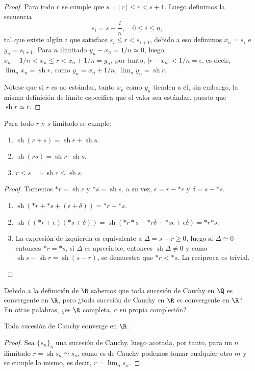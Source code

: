 \documentclass[11pt,oneside,a4paper]{book}
\DeclareMathOperator{\sh}{sh}
\begin{document}
\begin{proof}
Para todo $r$ se cumple que $s=\lfloor r\rfloor\leq r\lt s+1$. Luego definimos la secuencia
$$s_i=s+\frac{i}{n},\quad 0\leq i\leq n,$$
tal que existe algún $i$ que satisface $s_i\leq r\lt s_{i+1}$, debido a eso definimos $x_n=s_i$ e $y_n=s_{i+1}$. Para $n$ ilimitado $y_n-x_n=1/n\simeq 0$, luego $x_n-1/n\lt x_n\leq r\lt x_n+1/n=y_n$, por tanto, $|r-x_n|\lt1/n=\epsilon$, es decir, $\lim_n x_n=\sh r$, como $y_n=x_n+1/n$, $\lim_n y_n=\sh r$.

Nótese que si $r$ es no estándar, tanto $x_n$ como $y_n$ tienden a él, sin embargo, la misma definición de límite especifica que el valor sea estándar, puesto que $\sh r\simeq r$.
\end{proof}
\begin{thm}
Para todo $r$ y $s$ limitado se cumple:
\begin{enumerate}[$a$)]
\item $\sh(r+s)=\sh r+\sh s$.
\item $\sh(rs)=\sh r\cdot\sh s$.
\item $r\leq s\implies\sh r\leq\sh s$.
\end{enumerate}
\end{thm}
\begin{proof}
Tomemos $*r=\sh r$ y $*s=\sh s$, a su vez, $\epsilon=r-*r$ y $\delta=s-*s$.
\begin{enumerate}[$a$)]
\item $\sh(*r+*s+(\epsilon+\delta))=*r+*s$.
\item $\sh((*r+\epsilon)(*s+\delta))=\sh(*r*s+*r\delta+*s\epsilon+\epsilon\delta)={*r}{*s}$.
\item La expresión de izquierda es equivalente a $\Delta=s-r\geq 0$, luego si $\Delta\simeq 0$ entonces $*r=*s$, si $\Delta$ es apreciable, entonces $\sh\Delta\neq 0$ y como $\sh s-\sh r=\sh(s-r)$, se demuestra que $*r\lt*s$. La reciproca es trivial.
\end{enumerate}
\end{proof}
Debido a la definición de $\R$ sabemos que toda sucesión de Cauchy en $\Q$ es convergente en $\R$, pero ¿toda sucesión de Cauchy en $\R$ es convergente en $\R$? En otras palabras, ¿es $\R$ completa, o su propia compleción?
\begin{thm}[Compleción de $\R$]
Toda sucesión de Cauchy converge en $\R$.
\end{thm}
\begin{proof}
Sea $\{s_n\}_n$ una sucesión de Cauchy, luego acotada, por tanto, para un $n$ ilimitado $r=\sh s_n\simeq s_n$, como es de Cauchy podemos tomar cualquier otro $m$ y se cumple lo mismo, es decir, $r=\lim_n s_n$.
\end{proof}
\end{document}
